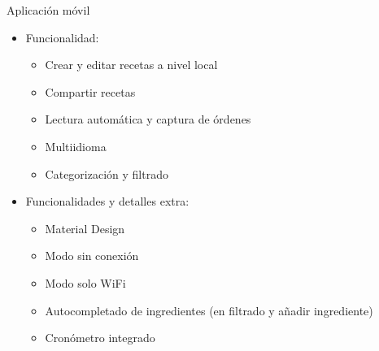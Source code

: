 \documentclass[10pt,xcolor=svgnames]{beamer}
\begin{document}
\begin{frame}{Aplicación móvil}
  \begin{itemize}
  \item Funcionalidad:
    \begin{itemize}
    \item Crear y editar recetas a nivel local
    \item Compartir recetas
    \item Lectura automática y captura de órdenes
    \item Multiidioma
    \item Categorización y filtrado
    \end{itemize}
  \item Funcionalidades y detalles extra:
    \begin{itemize}
    \item Material Design
    \item Modo sin conexión
    \item Modo solo WiFi
    \item Autocompletado de ingredientes (en filtrado y añadir ingrediente)
    \item Cronómetro integrado
    \end{itemize}
  \end{itemize}
\end{frame}
\end{document}
